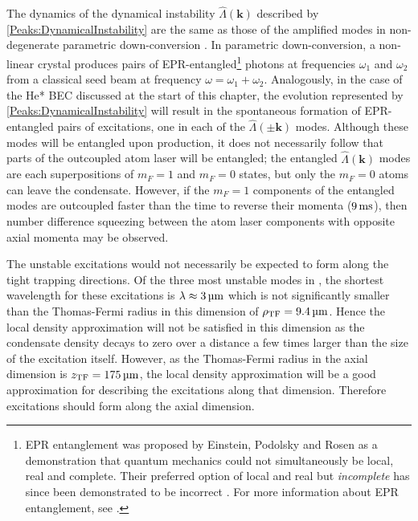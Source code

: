 The dynamics of the dynamical instability $\hat{\Lambda}(\bm{k})$ described by \eqref{Peaks:DynamicalInstability} are the same as those of the amplified modes in non-degenerate parametric down-conversion \citep{WallsMilburn}.  In parametric down-conversion, a non-linear crystal produces pairs of EPR-entangled\footnote{EPR entanglement was proposed by Einstein, Podolsky and Rosen \citep{Einstein:1935} as a demonstration that quantum mechanics could not simultaneously be local, real and complete.  Their preferred option of local and real but \emph{incomplete} has since been demonstrated to be incorrect \citep{Aspect:1982uq}.  For more information about EPR entanglement, see \citep[Chapter 18]{Scully}.} photons at frequencies $\omega_1$ and $\omega_2$ from a classical seed beam at frequency $\omega = \omega_1 + \omega_2$.  Analogously, in the case of the He* BEC discussed at the start of this chapter, the evolution represented by \eqref{Peaks:DynamicalInstability} will result in the spontaneous formation of EPR-entangled pairs of excitations, one in each of the $\hat{\Lambda}(\pm \bm{k})$ modes. Although these modes will be entangled upon production, it does not necessarily follow that parts of the outcoupled atom laser will be entangled; the entangled $\hat{\Lambda}(\bm{k})$ modes are each superpositions of $m_F=1$ and $m_F=0$ states, but only the $m_F=0$ atoms can leave the condensate. However, if the $m_F=1$ components of the entangled modes are outcoupled faster than the time to reverse their momenta ($\unit[9]{ms}$), then number difference squeezing between the atom laser components with opposite axial momenta may be observed.

The unstable excitations would not necessarily be expected to form along the tight trapping directions. Of the three most unstable modes in , the shortest wavelength for these excitations is $\lambda \approx \unit[3]{\micro m}$ which is not significantly smaller than the Thomas-Fermi radius in this dimension of $\rho_\text{TF} = \unit[9.4]{\micro m}$. Hence the local density approximation will not be satisfied in this dimension as the condensate density decays to zero over a distance a few times larger than the size of the excitation itself.  However, as the Thomas-Fermi radius in the axial dimension is $z_\text{TF} = \unit[175]{\micro m}$, the local density approximation will be a good approximation for describing the excitations along that dimension. Therefore excitations should form along the axial dimension.

